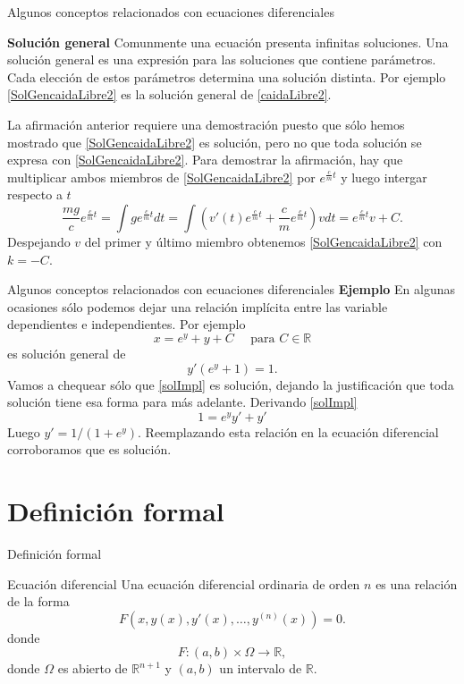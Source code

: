 \documentclass[handout,hyperref={colorlinks=true}]{beamer}
\newcommand{\rr}{\mathbb{R}}
\newcommand{\nl}{\onslide<+-> }
\begin{document}
\begin{frame}{Algunos conceptos relacionados con ecuaciones diferenciales}
 
\nl  \textbf{Solución general} Comunmente una ecuación presenta infinitas soluciones. Una solución general  es una expresión para las soluciones que 
contiene parámetros. Cada elección de estos parámetros determina una solución distinta. Por ejemplo \eqref{SolGencaidaLibre2} es la solución general de \eqref{caidaLibre2}.

\nl  La afirmación anterior requiere una demostración puesto que sólo hemos mostrado que \eqref{SolGencaidaLibre2} es solución, pero no
que toda solución se expresa con \eqref{SolGencaidaLibre2}. Para demostrar la afirmación, hay que multiplicar ambos miembros de \eqref{SolGencaidaLibre2} 
por $e^{\frac{c}{m}t}$ y luego intergar respecto a $t$ 
\[\frac{mg}{c}e^{\frac{c}{m}t}=\int ge^{\frac{c}{m}t}dt=\int \left(v'(t)e^{\frac{c}{m}t}+\frac{c}{m}e^{\frac{c}{m}t}\right) vdt=e^{\frac{c}{m}t}v+C.\]
 Despejando $v$ del primer y último miembro obtenemos \eqref{SolGencaidaLibre2} con $k=-C$.

 

\end{frame}

\begin{frame}{Algunos conceptos relacionados con ecuaciones diferenciales}
\textbf{Ejemplo} En algunas ocasiones sólo podemos dejar una relación implícita entre las variable dependientes e independientes. Por ejemplo
\begin{equation}\label{solImpl}x=e^y+y+C\quad\text{ para } C\in\rr\end{equation}
es solución general de
\[y'(e^y+1)=1.\]
Vamos a chequear sólo que \eqref{solImpl} es solución, dejando la justificación que toda solución tiene esa forma para más adelante. Derivando \eqref{solImpl}
\[ 1=e^yy'+y'\]
Luego $y'=1/(1+e^{y})$. Reemplazando esta relación  en la ecuación diferencial corroboramos que es solución.

\end{frame}

\section{Definición formal}
\begin{frame}{Definición formal}
\begin{block}{Ecuación diferencial} Una ecuación diferencial ordinaria de orden $n$ es una relación de la forma
\[\boxed{F(x,y(x),y'(x),\ldots,y^{(n)}(x))=0}.\]
donde
\[F:(a,b)\times \Omega\to\rr,
\]
donde $\Omega$ es abierto de $\rr^{n+1}$ y $(a,b)$ un intervalo de $\rr$.
 
\end{block}


\end{frame}
\end{document}
